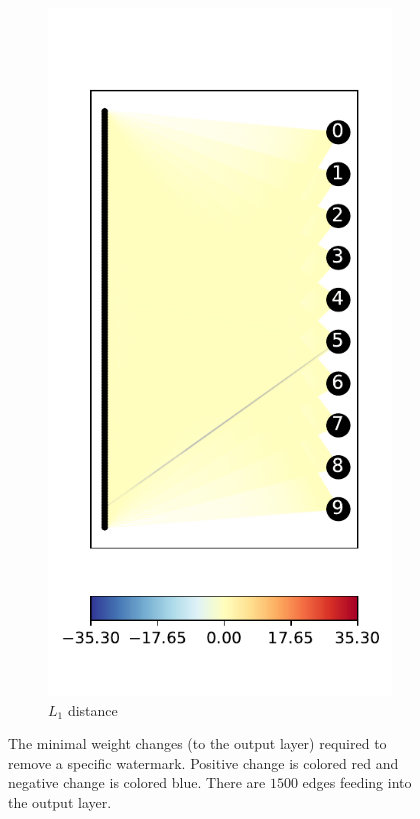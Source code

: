 \documentclass{easychair}
\begin{document}
\begin{figure}
\begin{subfigure}{0.4\linewidth}
  \end{subfigure}
  \begin{subfigure}{0.4\linewidth}
    \includegraphics[width=\linewidth]{../data/results/problem2/last_layer_1_wm_example.pdf}
    \caption{$L_1$ distance}
  \end{subfigure}
  \caption{The minimal weight changes (to the output layer) required
    to remove a specific watermark. Positive change is colored red and
    negative change is colored blue. There are $1500$ edges feeding
    into the output layer.}
  \label{fig:lastLayerExampleSingle}
\end{figure}
\end{document}
